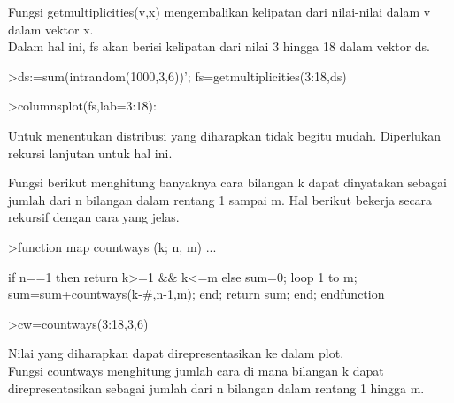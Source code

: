 \documentclass[a4paper,10pt]{article}
\begin{document}
\begin{eulernotebook}
\begin{eulercomment}
\begin{eulercomment}
\begin{eulercomment}
\begin{eulercomment}
\begin{eulercomment}
\begin{eulercomment}
\begin{eulercomment}
\begin{eulercomment}
\begin{eulercomment}
\begin{eulercomment}
\begin{eulercomment}
\begin{eulercomment}
\begin{eulercomment}
\begin{eulercomment}
\begin{eulercomment}
\begin{eulercomment}
\begin{eulercomment}
\begin{eulercomment}
\begin{eulercomment}
\begin{eulercomment}
\begin{eulercomment}
Fungsi getmultiplicities(v,x) mengembalikan kelipatan dari nilai-nilai
dalam v dalam vektor x.\\
Dalam hal ini, fs akan berisi kelipatan dari nilai 3 hingga 18 dalam
vektor ds.
\end{eulercomment}
\begin{eulerprompt}
>ds:=sum(intrandom(1000,3,6))';  fs=getmultiplicities(3:18,ds)
\end{eulerprompt}
\begin{euleroutput}
  [5,  15,  31,  42,  75,  98,  132,  114,  122,  106,  83,  74,  54,
  25,  16,  8]
\end{euleroutput}
\begin{eulerprompt}
>columnsplot(fs,lab=3:18):
\end{eulerprompt}
\begin{eulercomment}
Untuk menentukan distribusi yang diharapkan tidak begitu mudah.
Diperlukan rekursi lanjutan untuk hal ini.

Fungsi berikut menghitung banyaknya cara bilangan k dapat dinyatakan
sebagai jumlah dari n bilangan dalam rentang 1 sampai m. Hal berikut
bekerja secara rekursif dengan cara yang jelas.
\end{eulercomment}
\begin{eulerprompt}
>function map countways (k; n, m) ...
\end{eulerprompt}
\begin{eulerudf}
    if n==1 then return k>=1 && k<=m
    else
      sum=0; 
      loop 1 to m; sum=sum+countways(k-#,n-1,m); end;
      return sum;
    end;
  endfunction
\end{eulerudf}
\begin{eulerprompt}
>cw=countways(3:18,3,6)
\end{eulerprompt}
\begin{euleroutput}
  [1,  3,  6,  10,  15,  21,  25,  27,  27,  25,  21,  15,  10,  6,  3,
  1]
\end{euleroutput}
\begin{eulercomment}
Nilai yang diharapkan dapat direpresentasikan ke dalam plot.\\
Fungsi countways menghitung jumlah cara di mana bilangan k dapat
direpresentasikan sebagai jumlah dari n bilangan dalam rentang 1
hingga m.


\end{eulercomment}
\end{eulercomment}
\end{eulercomment}
\end{eulercomment}
\end{eulercomment}
\end{eulercomment}
\end{eulercomment}
\end{eulercomment}
\end{eulercomment}
\end{eulercomment}
\end{eulercomment}
\end{eulercomment}
\end{eulercomment}
\end{eulercomment}
\end{eulercomment}
\end{eulercomment}
\end{eulercomment}
\end{eulercomment}
\end{eulercomment}
\end{eulercomment}
\end{eulercomment}
\end{eulernotebook}
\end{document}

